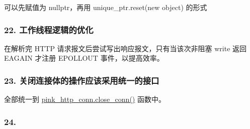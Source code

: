 可以先赋值为 nullptr，再用 unique\+\_\+ptr.\+reset(new object) 的形式

\subsubsection*{22. 工作线程逻辑的优化}

在解析完 H\+T\+TP 请求报文后尝试写出响应报文，只有当该次非阻塞 write 返回 E\+A\+G\+A\+IN 才注册 E\+P\+O\+L\+L\+O\+UT 事件，以提高效率。

\subsubsection*{23. 关闭连接体的操作应该采用统一的接口}

全部统一到 \hyperlink{classpink__http__conn_abdcd7c0da8072d62cb7212523f20298b}{pink\+\_\+http\+\_\+conn.\+close\+\_\+conn()} 函数中。

\subsubsection*{24.}